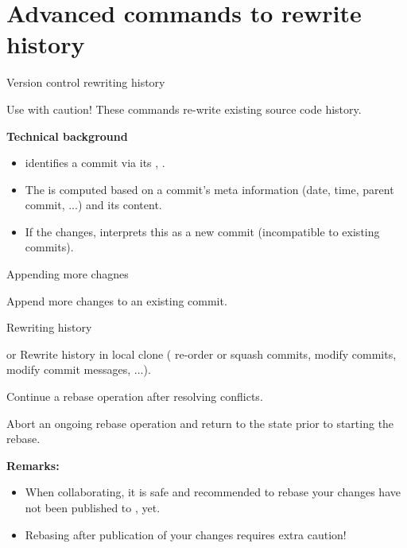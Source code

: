 \section{Advanced  commands to rewrite history}

\begin{frame}{Version control {\vs} rewriting history}
\begin{alertblock}{Use with caution!}
These commands re-write existing source code history.
\end{alertblock}

\textbf{Technical background}
\begin{itemize}
\item {} identifies a commit via its , {\eg} .
\item The  is computed based on a commit's meta information (date, time, parent commit, ...) and its content.
\item If the  changes,  interprets this as a new commit (incompatible to existing commits). 
\end{itemize}
\end{frame}

\begin{frame}{Appending more chagnes}
\begin{block}{}
Append more changes to an existing commit.
\end{block}
\end{frame}

\begin{frame}{Rewriting history}
\begin{block}{ or }
Rewrite history in local clone ({\eg} re-order or squash commits, modify commits, modify commit messages, ...).
\end{block}
\begin{block}{}
Continue a rebase operation after resolving conflicts.
\end{block}
\begin{block}{}
Abort an ongoing rebase operation and return to the state prior to starting the rebase.
\end{block}
\textbf{Remarks:}
\begin{itemize}
\item When collaborating, it is safe and recommended to rebase  your changes have not been published to , yet.
\item Rebasing after publication of your changes requires extra caution!
\end{itemize}

\end{frame}

